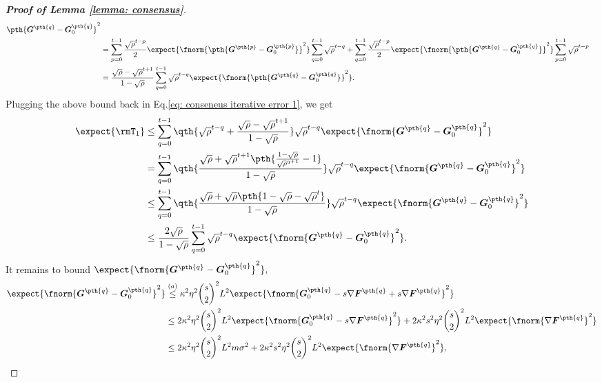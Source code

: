 \documentclass[letterpaper, 10 pt, conference]{ieeeconf}  %
\begin{document}
\begin{proof}[\bf Proof of Lemma \ref{lemma: consensus}]
\begin{align*}
{{{    \pth{
    \bm{G}^{\pth{q}} - \bm{G}_0^{\pth{q}}
    }}^2 }}\\
    & = \sum_{p=0}^{t-1}  
    \frac{\sqrt{\rho}^{t-p}}{2}\expect{
    \fnorm{\pth{
    \bm{G}^{\pth{p}} - \bm{G}_0^{\pth{p}}
    }}^2 }
    \sum_{q=0}^{t-1}\sqrt{\rho}^{t-q}
    +
    \sum_{q=0}^{t-1}  \frac{\sqrt{\rho}^{t-p}}{2}\expect{
    \fnorm{
    \pth{
    \bm{G}^{\pth{q}} - \bm{G}_0^{\pth{q}}
    }}^2 }
    \sum_{p=0}^{t-1}
    \sqrt{\rho}^{t-p}\\ 
    & = \frac{\sqrt{\rho} - \sqrt{\rho}^{t+1}}{1-\sqrt{\rho}}\sum_{q=0}^{t-1}  \sqrt{\rho}^{t-q}\expect{
    \fnorm{
    \pth{
    \bm{G}^{\pth{q}} - \bm{G}_0^{\pth{q}}
    }}^2 }.
\end{align*}
Plugging the above bound back in Eq.\eqref{eq: conseneus iterative error 1}, we get
\begin{align*}
\expect{\rmT_1} 
    & \le  \sum_{q=0}^{t-1} 
    \qth{\sqrt{\rho}^{t-q} + \frac{\sqrt{\rho} - \sqrt{\rho}^{t+1}}{1-\sqrt{\rho}}}
    \sqrt{\rho}^{t-q}\expect{\fnorm{\bm{G}^{\pth{q}} - \bm{G}_0^{\pth{q}}}^2 }\\
    & = \sum_{q=0}^{t-1} 
    \qth{\frac{\sqrt{\rho} + \sqrt{\rho}^{t+1} \pth{\frac{1 - \sqrt{\rho}}{\sqrt{\rho}^{q+1}}-1} }{1-\sqrt{\rho}}}
    \sqrt{\rho}^{t-q}\expect{\fnorm{\bm{G}^{\pth{q}} - \bm{G}_0^{\pth{q}}}^2  }\\
    & \le \sum_{q=0}^{t-1} 
    \qth{\frac{\sqrt{\rho} + \sqrt{\rho} \pth{1 - \sqrt{\rho} - \sqrt{\rho}^t} }{1-\sqrt{\rho}}}
    \sqrt{\rho}^{t-q}\expect{\fnorm{\bm{G}^{\pth{q}} - \bm{G}_0^{\pth{q}}}^2 }\\
    & \le \frac{2\sqrt{\rho}}{1-\sqrt{\rho}}\sum_{q=0}^{t-1} 
    \sqrt{\rho}^{t-q}\expect{\fnorm{\bm{G}^{\pth{q}} - \bm{G}_0^{\pth{q}}}^2 }.
\end{align*}
It remains to bound $\expect{\fnorm{\bm{G}^{\pth{q}} - \bm{G}_0^{\pth{q}}}^2 },$
\begin{align*}
    \expect{\fnorm{\bm{G}^{\pth{q}} - \bm{G}_0^{\pth{q}}}^2 } 
    & \overset{(a)}{\le} \kappa^2 \eta^2 \binom{s}{2}^2 L^2 \expect{\fnorm{\bm{G}_0^{\pth{q}} - s\nabla \bm{F}^{\pth{q}} + s\nabla \bm{F}^{\pth{q}}  }^2 }\\
    & \le 2 \kappa^2 \eta^2 \binom{s}{2}^2 L^2 \expect{\fnorm{\bm{G}_0^{\pth{q}} - s\nabla \bm{F}^{\pth{q}}}^2 } 
        + 2 \kappa^2 s^2 \eta^2 \binom{s}{2}^2 L^2 \expect{\fnorm{\nabla \bm{F}^{\pth{q}}}^2 }\\
    & \le 2 \kappa^2 \eta^2 \binom{s}{2}^2 L^2 m \sigma^2 
        + 2 \kappa^2 s^2 \eta^2 \binom{s}{2}^2 L^2 \expect{\fnorm{\nabla \bm{F}^{\pth{q}}}^2 }, 

\end{align*}
\end{proof}
\end{document}
